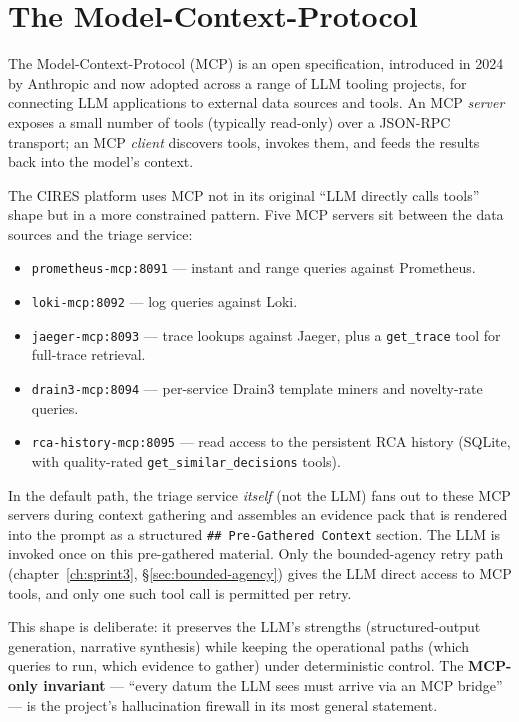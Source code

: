 \documentclass[11pt,a4paper,oneside]{report}
\begin{document}
\section{The Model-Context-Protocol}

The Model-Context-Protocol (MCP) is an open specification, introduced
in 2024 by Anthropic and now adopted across a range of LLM tooling
projects, for connecting LLM applications to external data sources
and tools.  An MCP \emph{server} exposes a small number of tools
(typically read-only) over a JSON-RPC transport; an MCP \emph{client}
discovers tools, invokes them, and feeds the results back into the
model's context.

The CIRES platform uses MCP not in its original ``LLM directly calls
tools'' shape but in a more constrained pattern.  Five MCP servers
sit between the data sources and the triage service:

\begin{itemize}
  \item \texttt{prometheus-mcp:8091}  --- instant and range queries
        against Prometheus.
  \item \texttt{loki-mcp:8092}  --- log queries against Loki.
  \item \texttt{jaeger-mcp:8093}  --- trace lookups against Jaeger,
        plus a \texttt{get\_trace} tool for full-trace retrieval.
  \item \texttt{drain3-mcp:8094}  --- per-service Drain3 template
        miners and novelty-rate queries.
  \item \texttt{rca-history-mcp:8095}  --- read access to the
        persistent RCA history (SQLite, with quality-rated
        \texttt{get\_similar\_decisions} tools).
\end{itemize}

In the default path, the triage service \emph{itself} (not the LLM)
fans out to these MCP servers during context gathering and assembles
an evidence pack that is rendered into the prompt as a structured
\texttt{\#\# Pre-Gathered Context} section.  The LLM is invoked once
on this pre-gathered material.  Only the bounded-agency retry path
(chapter~\ref{ch:sprint3}, \S\ref{sec:bounded-agency}) gives the LLM
direct access to MCP tools, and only one such tool call is permitted
per retry.

This shape is deliberate: it preserves the LLM's strengths
(structured-output generation, narrative synthesis) while keeping the
operational paths (which queries to run, which evidence to gather)
under deterministic control.  The \textbf{MCP-only invariant} ---
``every datum the LLM sees must arrive via an MCP bridge'' --- is the
project's hallucination firewall in its most general statement.
\end{document}
